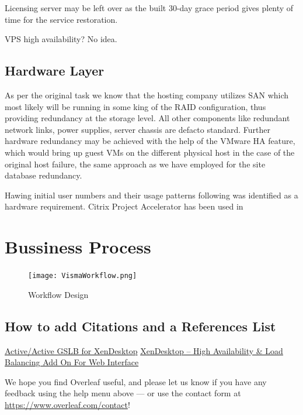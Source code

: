 \documentclass[a4paper]{article}
\begin{document}
	Licensing server may be left over as the built 30-day grace period gives plenty of time for the service restoration.
	
	VPS high availability? No idea.         
	
	\subsection{Hardware Layer}
	
	As per the original task we know that the hosting company utilizes SAN which most likely will be running in some king of the RAID configuration, thus providing redundancy at the storage level. All other components like redundant network links, power supplies, server chassis are defacto standard. Further hardware redundancy may be achieved with the help of the VMware HA feature, which would bring up guest VMs on the different physical host in the case of the original host failure, the same approach as we have employed for the site database redundancy.
	
	Hawing initial user numbers and their usage patterns following was identified as a hardware requirement. Citrix Project Accelerator has been used in  
	
	\section{Bussiness Process}
	
	\begin{figure}
		\centering
		\texttt{[image: VismaWorkflow.png]}
		\caption{\label{fig:VismaWorkflow}Workflow Design}
	\end{figure}
	
	\subsection{How to add Citations and a References List}
	\href{https://www.citrix.com/blogs/2014/04/09/activeactive-gslb-for-xendesktop-a-practical-approach-part-1/}{Active/Active GSLB for XenDesktop}
	\href{https://www.citrix.com/blogs/2012/11/24/xendesktop-high-availability-load-balancing-add-on-for-web-interface/}{XenDesktop – High Availability \& Load Balancing Add On For Web Interface}

	
	We hope you find Overleaf useful, and please let us know if you have any feedback using the help menu above --- or use the contact form at \url{https://www.overleaf.com/contact}!
	
	
	
	
\end{document}
